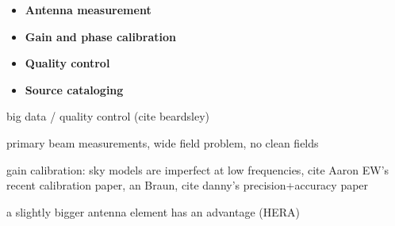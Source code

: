 \begin{itemize}
	\item \textbf{Antenna measurement} 
	\item \textbf{Gain and phase calibration} 
	\item \textbf{Quality control} 
	\item \textbf{Source cataloging} 
\end{itemize}



big data / quality control (cite beardsley)
\citep{beardsley16}

primary beam measurements, wide field problem, no clean fields

gain calibration: sky models are imperfect at low frequencies, cite Aaron EW's recent calibration paper, an Braun, cite danny's precision+accuracy paper
\citep{jacobs2013,braun2013,ewallwice16b}

a slightly bigger antenna element has an advantage (HERA)
\citep{deboer16}



%
%
%
%
